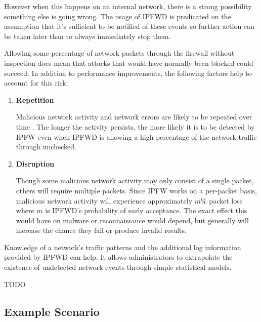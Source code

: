 \documentclass[journal]{IEEEtran}
\begin{document}
  However when this happens on an internal network, there is a strong
  possibility something else is going wrong. The usage of IPFWD is predicated
  on the assumption that it's sufficient to be notified of these events so
  further action can be taken later than to always immediately stop them.

  Allowing some percentage of network packets through the firewall without
  inspection does mean that attacks that would have normally been blocked could
  succeed. In addition to performance improvements, the following factors help
  to account for this risk:

  \begin{enumerate}

    \item \textbf{Repetition} 

      Malicious network activity and network errors are likely to be repeated
      over time \cite{beacondetection}. The longer the activity persists, the
      more likely it is to be detected by IPFW even when IPFWD is allowing a
      high percentage of the network traffic through unchecked.

    \item \textbf{Disruption} 

      Though some malicious network activity may only consist of a single
      packet, others will require multiple packets. Since IPFW works on a
      per-packet basis, malicious network activity will experience
      approximately $m\%$ packet loss where $m$ is IPFWD's probability of early
      acceptance. The exact effect this would have on malware or reconnaissance
      would depend, but generally will increase the chance they fail or produce
      invalid results.

  \end{enumerate}

  Knowledge of a network's traffic patterns and the additional log information
  provided by IPFWD can help. It allows administrators to extrapolate the
  existence of undetected network events through simple statistical models.

  TODO

  \subsection{Example Scenario} 
\end{document}

